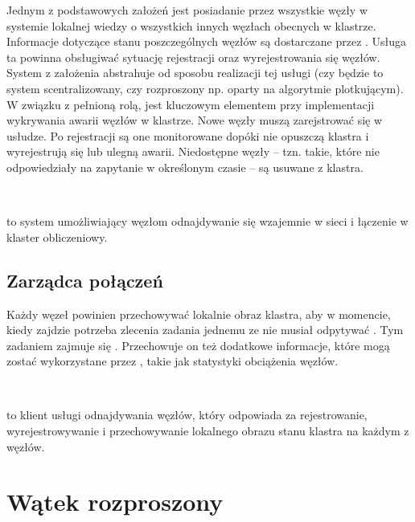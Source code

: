 Jednym z podstawowych założeń jest posiadanie przez wszystkie węzły
w systemie lokalnej wiedzy o wszystkich innych węzłach obecnych w
klastrze. Informacje dotyczące stanu poszczególnych węzłów są dostarczane
przez . Usługa ta powinna
obsługiwać sytuację rejestracji oraz wyrejestrowania się węzłów. System
z założenia abstrahuje od sposobu realizacji tej usługi (czy będzie
to system scentralizowany, czy rozproszony np. oparty na algorytmie
plotkującym). W związku z pełnioną rolą, 
jest kluczowym elementem przy implementacji wykrywania awarii węzłów
w klastrze. Nowe węzły muszą zarejstrować się w usłudze. Po rejestracji
są one monitorowane dopóki nie opuszczą klastra i wyrejestrują się
lub ulegną awarii. Niedostępne węzły -- tzn. takie, które nie odpowiedziały
na zapytanie w określonym czasie -- są usuwane z klastra.
\begin{defn}
~

\noindent \label{def:background-Usluga-odnajdywania-wezlow}
to system umożliwiający węzłom odnajdywanie się wzajemnie w sieci
i łączenie w klaster obliczeniowy.
\end{defn}

\subsection{Zarządca połączeń}

Każdy węzeł powinien przechowywać lokalnie obraz klastra, aby w momencie,
kiedy zajdzie potrzeba zlecenia zadania jednemu ze 
nie musiał odpytywać . Tym
zadaniem zajmuje się . Przechowuje
on też dodatkowe informacje, które mogą zostać wykorzystane przez
, takie jak statystyki obciążenia węzłów.
\begin{defn}
~

\noindent {} to klient usługi odnajdywania
węzłów, który odpowiada za rejestrowanie, wyrejestrowywanie i przechowywanie
lokalnego obrazu stanu klastra na każdym z węzłów.
\end{defn}

\section{Wątek rozproszony}

